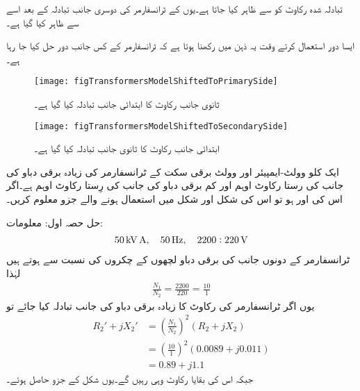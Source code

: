 تبادلہ شدہ رکاوٹ   کو   سے ظاہر کیا جاتا ہے۔یوں  کے ٹرانسفارمر کی دوسری جانب تبادلہ کے بعد اسے  سے ظاہر کیا گیا ہے۔

ایسا دور استعمال کرتے وقت یہ ذہن میں رکھنا ہوتا ہے کہ ٹرانسفارمر کے کس جانب دور حل کیا جا رہا ہے۔
\begin{figure}
\centering
\texttt{[image: figTransformersModelShiftedToPrimarySide]}
\caption{ثانوی جانب رکاوٹ کا ابتدائی جانب تبادلہ کیا گیا ہے۔}
\label{شکل_ٹرانسفارمر_مکمل_ماڈل_ابتدائی_جانب}
\end{figure}
%
\begin{figure}
\centering
\texttt{[image: figTransformersModelShiftedToSecondarySide]}
\caption{ابتدائی جانب رکاوٹ کا ثانوی جانب تبادلہ کیا گیا ہے۔}
\label{شکل_ٹرانسفارمر_مکمل_ماڈل_ثانوی_جانب}
\end{figure}


%
ایک  کلو وولٹ-ایمپیئر اور   وولٹ برقی سکت کے ٹرانسفارمر کی زیادہ برقی دباو کی جانب کی رستا رکاوٹ   اوہم اور کم برقی دباو کی جانب کی رِستا رکاوٹ  اوہم ہے۔اگر اس کی  اور   ہو تو اس کی شکل   اور شکل   میں استعمال ہونے والے جزو معلوم کریں۔

	حل حصہ اول:
معلومات:
\begin{align*}
\SI{50}{\kilo \volt \ampere}, \quad \SI{50}{\hertz}, \quad 2200:220\,\textup{V}
\end{align*}
ٹرانسفارمر کے دونوں جانب کی برقی دباو لچھوں کے چکروں کی نسبت سے ہوتے ہیں لہٰذا
\begin{align*}
\frac{N_1}{N_2}=\frac{2200}{220}=\frac{10}{1}
\end{align*}
یوں اگر ٹرانسفارمر کی رکاوٹ کا زیادہ برقی دباو کی جانب تبادلہ کیا جائے تو
\begin{align*}
R_2'+j X_2' &=\left(\frac{N_1}{N_2} \right)^2 \left(R_2+j X_2 \right)\\
&=\left(\frac{10}{1} \right)^2 \left(0.0089+j 0.011 \right)\\
&=0.89+j 1.1
\end{align*}
جبکہ اس کی بقایا رکاوٹ وہی رہیں گے۔یوں شکل   کے جزو حاصل ہوئے۔

